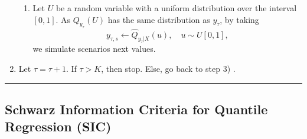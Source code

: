 \begin{enumerate}
\begin{enumerate}
		
		\item Let $U$ be a random variable with a uniform distribution over the interval $[0,1]$. As $Q_{y_\tau}(U)$ has the same distribution as $y_\tau$, by taking
		$$y_{\tau,s} \leftarrow \hat Q_{y_\tau | X}(u), \quad u \sim U[0,1],$$
		we simulate scenarios next values.



		 \end{enumerate}
	
	
	\item Let $\tau = \tau + 1$. If $\tau > K$, then stop. Else, go back to step 3) . 


\end{enumerate}

\noindent\rule{\columnwidth}{1pt}


\subsection{Schwarz Information Criteria for Quantile Regression (SIC)} \label{sec:SIC}

